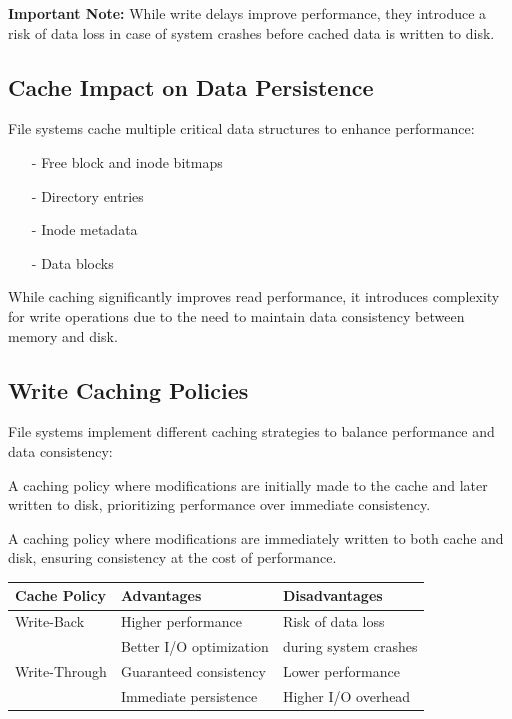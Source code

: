 \documentclass[../../compsys.tex]{subfiles}
\begin{document}
\textbf{Important Note:} While write delays improve performance, they introduce a risk of data loss in case of system crashes before cached data is written to disk.

\subsection{Cache Impact on Data Persistence}
File systems cache multiple critical data structures to enhance performance:
\begin{itemize}
    \item[-] Free block and inode bitmaps
    \item[-] Directory entries
    \item[-] Inode metadata
    \item[-] Data blocks
\end{itemize}

While caching significantly improves read performance, it introduces complexity for write operations due to the need to maintain data consistency between memory and disk.

\subsection{Write Caching Policies}
File systems implement different caching strategies to balance performance and data consistency:
\vspace{5px}
\begin{definition}
A caching policy where modifications are initially made to the cache and later written to disk, prioritizing performance over immediate consistency.
\end{definition}
\vspace{5px}
\begin{definition}
A caching policy where modifications are immediately written to both cache and disk, ensuring consistency at the cost of performance.
\end{definition}

\begin{center}
\begin{tabular}{|l|l|l|}
\hline
\textbf{Cache Policy} & \textbf{Advantages} & \textbf{Disadvantages} \\
\hline
Write-Back & Higher performance & Risk of data loss \\
& Better I/O optimization & during system crashes \\
\hline
Write-Through & Guaranteed consistency & Lower performance \\
& Immediate persistence & Higher I/O overhead \\
\hline
\end{tabular}
\end{center}
\end{document}
